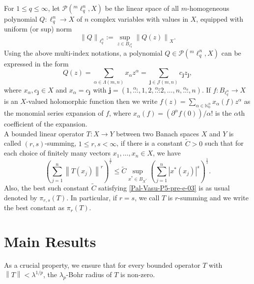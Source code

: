 \documentclass[a4paper,12pt]{amsart}
\theoremstyle{definition}
\newcommand{\norm}[1]{\left\lVert#1\right\rVert}
\begin{document}
For $1\leq q\leq \infty$, let $\mathcal{P}(^m\ell^n_q,X)$ be the linear space of all $m$-homogeneous polynomial $Q:\ell^n_q\rightarrow X$ of $n$ complex variables with values in $X$, equipped with uniform (or sup) norm 
\begin{equation*}
	\norm{Q}_{\ell^n_q}:=\sup_{z\in B_{\ell^n_{q}}}\norm{Q(z)}_{X}.
\end{equation*}
Using the above multi-index notations, a polynomial $Q\in \mathcal{P}(^m\ell^n_q,X)$
can be expressed in the form 
\begin{equation*}
	Q(z)=\sum_{\alpha\in\Lambda(m,n)}x_{\alpha}z^{\alpha}=\sum_{\mathbf{j}\in \mathcal{J}(m,n)} c_{\mathbf{j}}z_{\mathbf{j}},
\end{equation*}
where $x_{\alpha}, c_{\mathbf{j}}\in X$ and $x_{\alpha}=c_{\mathbf{j}}$ with $\mathbf{j}=\left(1,\stackrel{\alpha_1}{\ldots},1, 2,\stackrel{\alpha_{2}}{\ldots}2, \ldots,n,\stackrel{\alpha_n}{\ldots},n\right)$. If $f:B_{\ell^n_q}\rightarrow X$ is an $X$-valued holomorphic function then we write $f(z)=\sum_{\alpha\in \mathbb{N}^n_{0}}x_{\alpha}(f)z^{\alpha}$ as the monomial series expansion of $f$, where $x_{\alpha}(f)=(\partial^{\alpha}f(0))/\alpha!$ is the $\alpha$th coefficient of the expansion.\\[1mm]

A bounded linear operator $T:X\rightarrow Y$ between two Banach spaces $X$ and $Y$ is called $(r,s)$-summing, $1\leq r,s<\infty$, if there is a constant $\widetilde{C}>0$ such that for each choice of finitely many vectors $x_1,\ldots,x_n\in X$, we have
\begin{equation}\label{Pal-Vasu-P5-pre-e-03}
	\left(\sum_{j=1}^{n}\norm{T(x_j)}^r\right)^{\frac{1}{r}}\leq \widetilde{C}\sup_{x^*\in B_{X^*}}\left(\sum_{j=1}^{n}|x^*(x_j)|^s\right)^{\frac{1}{s}}.
\end{equation}
Also, the best such constant $\widetilde{C}$ satisfying \eqref{Pal-Vasu-P5-pre-e-03} is as usual denoted by $\pi_{r,s}(T)$. In particular, if $r=s$, we call $T$ is $r$-summing and we write the best constant as $\pi_r(T)$.
\section{Main Results}\label{Pal-Vasu-P5-section-03}
As a crucial property, we ensure that for every bounded operator $T$ with $\norm{T}<\lambda^{1/p}$, the $\lambda_{p}$-Bohr radius of $T$ is non-zero.
\end{document}
